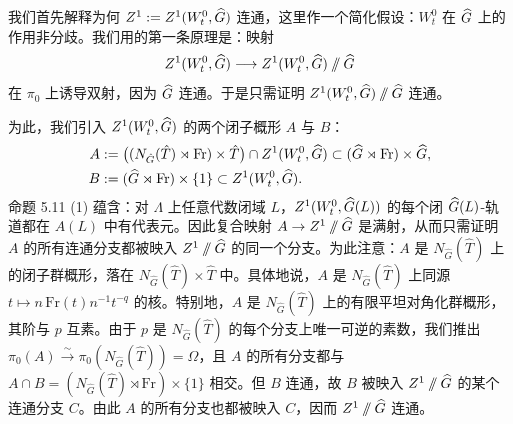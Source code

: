 我们首先解释为何 $Z^1:=Z^1(W_t^0,\widehat{G})$ 连通，这里作一个简化假设：$W_t^0$ 在 $\widehat{G}$ 上的作用非分歧。我们用的第一条原理是：映射
\[
Z^1(W_t^0,\widehat{G})\longrightarrow Z^1(W_t^0,\widehat{G})\sslash\widehat{G}
\]
在 $\pi_0$ 上诱导双射，因为 $\widehat{G}$ 连通。于是只需证明 $Z^1(W_t^0,\widehat{G})\sslash\widehat{G}$ 连通。

为此，我们引入 $Z^1(W_t^0,\widehat{G})$ 的两个闭子概形 $A$ 与 $B$：
\begin{align*}
A&:=\bigl((N_{\hat G}(\hat T)\rtimes\mathrm{Fr})\times\hat T\bigr)\cap Z^1(W_t^0,\widehat{G})\subset(\widehat{G}\rtimes\mathrm{Fr})\times\widehat{G},\\
B&:=(\widehat{G}\rtimes\mathrm{Fr})\times\{1\}\subset Z^1(W_t^0,\widehat{G}).
\end{align*}
命题 5.11 (1) 蕴含：对 $\Lambda$ 上任意代数闭域 $L$，$Z^1(W_t^0,\widehat{G}(L))$ 的每个闭 $\widehat{G}(L)$-轨道都在 $A(L)$ 中有代表元。因此复合映射 $A\to Z^1\sslash\widehat{G}$ 是满射，从而只需证明 $A$ 的所有连通分支都被映入 $Z^1\sslash\widehat{G}$ 的同一个分支。为此注意：$A$ 是 $N_{\hat G}(\hat T)$ 上的闭子群概形，落在 $N_{\hat G}(\hat T)\times\hat T$ 中。具体地说，$A$ 是 $N_{\hat G}(\hat T)$ 上同源 $t\mapsto n\,\mathrm{Fr}(t)n^{-1}t^{-q}$ 的核。特别地，$A$ 是 $N_{\hat G}(\hat T)$ 上的有限平坦对角化群概形，其阶与 $p$ 互素。由于 $p$ 是 $N_{\hat G}(\hat T)$ 的每个分支上唯一可逆的素数，我们推出 $\pi_0(A)\xrightarrow{\sim}\pi_0(N_{\hat G}(\hat T))=\Omega$，且 $A$ 的所有分支都与 $A\cap B=(N_{\hat G}(\hat T)\rtimes\mathrm{Fr})\times\{1\}$ 相交。但 $B$ 连通，故 $B$ 被映入 $Z^1\sslash\widehat{G}$ 的某个连通分支 $C$。由此 $A$ 的所有分支也都被映入 $C$，因而 $Z^1\sslash\widehat{G}$ 连通。

